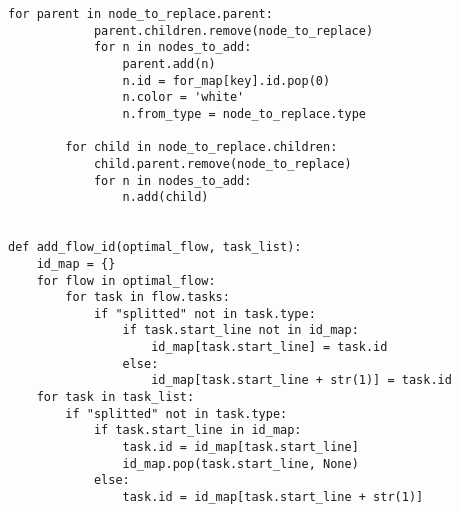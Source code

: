 \documentclass[a4paper,10pt,twoside]{book}
\begin{document}
\begin{lstlisting}[language=CCC, caption=pargraph.py]
		for parent in node_to_replace.parent:
			parent.children.remove(node_to_replace)
			for n in nodes_to_add:
				parent.add(n)
				n.id = for_map[key].id.pop(0)
				n.color = 'white'
				n.from_type = node_to_replace.type

		for child in node_to_replace.children:
			child.parent.remove(node_to_replace)
			for n in nodes_to_add:
				n.add(child) 


def add_flow_id(optimal_flow, task_list):
	id_map = {}
	for flow in optimal_flow:
		for task in flow.tasks:
			if "splitted" not in task.type:
				if task.start_line not in id_map:
					id_map[task.start_line] = task.id
				else:
					id_map[task.start_line + str(1)] = task.id
	for task in task_list:
		if "splitted" not in task.type:
			if task.start_line in id_map:
				task.id = id_map[task.start_line]
				id_map.pop(task.start_line, None)
			else:
				task.id = id_map[task.start_line + str(1)]

\end{lstlisting}
\end{document}
